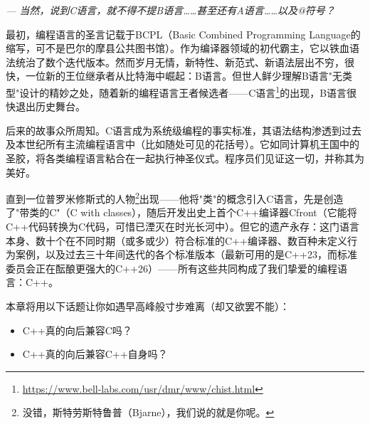 \begin{flushright}
\textit{--- 当然，说到C语言，就不得不提B语言……甚至还有A语言……以及@符号？}
\end{flushright}

最初，编程语言的圣言记载于BCPL（Basic Combined Programming Language的缩写，可不是巴尔的摩县公共图书馆）。作为编译器领域的初代霸主，它以铁血语法统治了数个迭代版本。然而岁月无情，新特性、新范式、新语法层出不穷，很快，一位新的王位继承者从比特海中崛起：B语言。但世人鲜少理解B语言"无类型"设计的精妙之处，随着新的编程语言王者候选者——C语言\footnote{\url{https://www.bell-labs.com/usr/dmr/www/chist.html}}的出现，B语言很快退出历史舞台。

后来的故事众所周知。C语言成为系统级编程的事实标准，其语法结构渗透到过去及本世纪所有主流编程语言中（比如随处可见的花括号）。它如同计算机王国中的圣胶，将各类编程语言粘合在一起执行神圣仪式。程序员们见证这一切，并称其为美好。

直到一位普罗米修斯式的人物\footnote{没错，斯特劳斯特鲁普（Bjarne），我们说的就是你呢。}出现——他将"类"的概念引入C语言，先是创造了"带类的C"（C with classes），随后开发出史上首个C++编译器Cfront（它能将C++代码转换为C代码，可惜已湮灭在时光长河中）。但它的遗产永存：这门语言本身、数十个在不同时期（或多或少）符合标准的C++编译器、数百种未定义行为案例，以及过去三十年间迭代的各个标准版本（最新可用的是C++23，而标准委员会正在酝酿更强大的C++26）——所有这些共同构成了我们挚爱的编程语言：C++。

本章将用以下话题让你如遇早高峰般寸步难离（却又欲罢不能）：

\begin{itemize}
\item 
C++真的向后兼容C吗？

\item 
C++真的向后兼容C++自身吗？
\end{itemize}

























